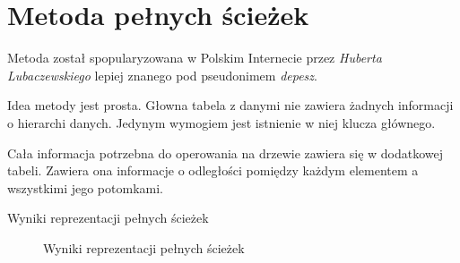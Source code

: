 \section{Metoda pełnych ścieżek}
% 


Metoda został spopularyzowana w Polskim Internecie przez \emph{Huberta Lubaczewskiego} lepiej znanego pod pseudonimem \emph{depesz}.


Idea metody jest prosta. 
Głowna tabela z danymi nie zawiera żadnych informacji o hierarchi danych. 
Jedynym wymogiem jest istnienie w niej klucza głównego.

Cała informacja potrzebna do operowania na drzewie zawiera się w dodatkowej tabeli. 
Zawiera ona informacje o odległości pomiędzy każdym elementem a wszystkimi jego potomkami.
 











\begin{table}[h!]
  \caption{Wyniki reprezentacji pełnych ścieżek}
   \begin{center}
   \end{center}
\end{table}

\begin{figure}[h!t]
  \caption{Wyniki reprezentacji pełnych ścieżek}
  \label{fig:img_chart_nested}
  \begin{center}
  \end{center}
\end{figure}
